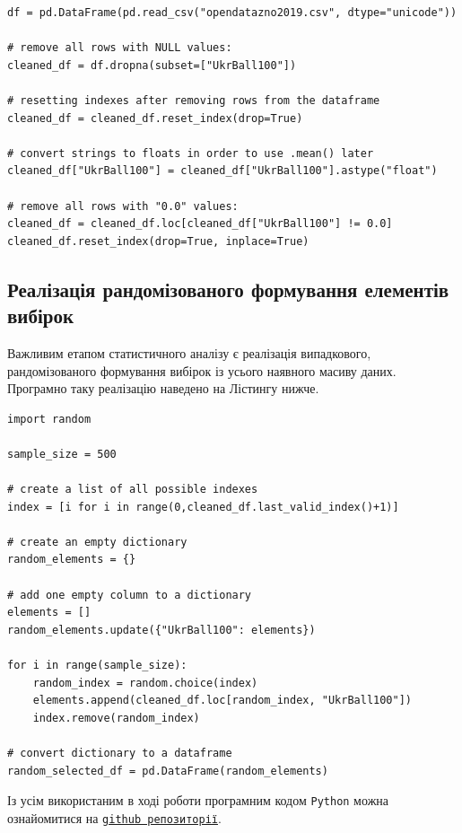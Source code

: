 \begin{lstlisting}[firstnumber=36, label = code: cleaning data, caption = Чистка даних]
df = pd.DataFrame(pd.read_csv("opendatazno2019.csv", dtype="unicode"))

# remove all rows with NULL values:
cleaned_df = df.dropna(subset=["UkrBall100"])

# resetting indexes after removing rows from the dataframe
cleaned_df = cleaned_df.reset_index(drop=True)

# convert strings to floats in order to use .mean() later
cleaned_df["UkrBall100"] = cleaned_df["UkrBall100"].astype("float") 

# remove all rows with "0.0" values:
cleaned_df = cleaned_df.loc[cleaned_df["UkrBall100"] != 0.0]
cleaned_df.reset_index(drop=True, inplace=True)
\end{lstlisting}

\subsection*{Реалізація рандомізованого формування елементів вибірок}

Важливим етапом статистичного аналізу є реалізація випадкового, рандомізованого формування вибірок із усього 
наявного масиву даних. Програмно таку реалізацію наведено на Лістингу нижче.

\begin{lstlisting}[firstnumber=51, label = code: randomization, caption = Рандомізоване формування вибірок]
import random

sample_size = 500

# create a list of all possible indexes
index = [i for i in range(0,cleaned_df.last_valid_index()+1)]

# create an empty dictionary
random_elements = {}

# add one empty column to a dictionary
elements = []
random_elements.update({"UkrBall100": elements})

for i in range(sample_size):
    random_index = random.choice(index)
    elements.append(cleaned_df.loc[random_index, "UkrBall100"])
    index.remove(random_index)

# convert dictionary to a dataframe
random_selected_df = pd.DataFrame(random_elements)
\end{lstlisting}

\vspace{0.4cm}
Із усім використаним в ході роботи програмним кодом \texttt{Python} можна ознайомитися на  
\href{https://github.com/Arroneq/SA-PYTHON.git}{\texttt{github репозиторії}}.